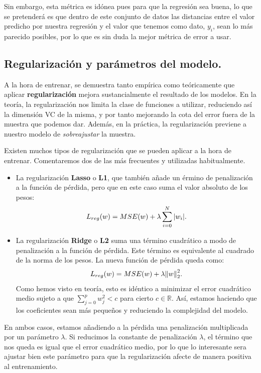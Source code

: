 \documentclass[a4paper, 20pt]{article}
\newcommand{\R}{\mathbb R}
\begin{document}
Sin embargo, esta métrica es idónea pues para que la regresión sea buena, lo que se pretenderá es que dentro de este conjunto de datos las distancias entre el valor predicho por nuestra regresión y el valor que tenemos como dato, $y_i$, sean lo más parecido posibles, por lo que es sin duda la mejor métrica de error a usar.


\subsection{Regularización y parámetros del modelo.}

A la hora de entrenar, se demuestra tanto empírica como teóricamente que aplicar \textbf{regularización} mejora sustancialmente el resultado de los modelos. En la teoría, la regularización nos limita la clase de funciones a utilizar, reduciendo así la dimensión VC de la misma, y por tanto mejorando la cota del error fuera de la muestra que podemos dar. Además, en la práctica, la regularización previene a nuestro modelo de \emph{sobreajustar} la muestra.

Existen muchos tipos de regularización que se pueden aplicar a la hora de entrenar. Comentaremos dos de las más frecuentes y utilizadas habitualmente. 

\begin{itemize}
   

    \item La regularización \textbf{Lasso} o \textbf{L1}, que también añade un érmino de penalización a la función de pérdida, pero que en este caso suma el valor absoluto de los pesos:
    $$
    L_{reg}(w) = MSE(w) + \lambda \sum_{i = 0}^N \abs{w_i}.
    $$

    \item La regularización \textbf{Ridge} o \textbf{L2} suma una término cuadrático a modo de penalización a la función de pérdida. Este término es equivalente al cuadrado de la norma de los pesos.  La nueva función de pérdida queda como:
    $$
    L_{reg}(w) = MSE(w) + \lambda \norm{w}_2^2 .
    $$
    Como hemos visto en teoría, esto es idéntico a minimizar el error cuadrático medio sujeto a que $\sum_{j = 0}^p w_j^2 < c$ para cierto $c\in \R$. Así, estamos haciendo que los coeficientes sean más pequeños y reduciendo la complejidad del modelo.
\end{itemize}

En ambos casos, estamos añadiendo a la pérdida una penalización multiplicada por un parámetro $\lambda$. Si reducimos la constante de penalización $\lambda$, el término que nos queda es igual que el error cuadrático medio, por lo que lo interesante sera ajustar bien este parámetro para que la regularización afecte de manera positiva al entrenamiento.
\end{document}
